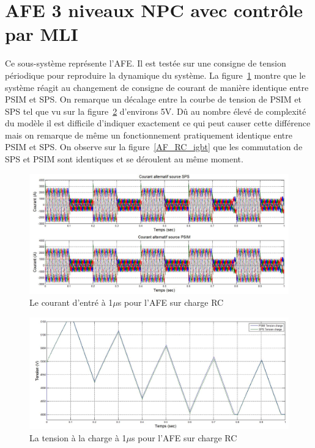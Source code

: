 \clearpage
\section{AFE 3 niveaux NPC avec contrôle par MLI}
Ce sous-système représente l'AFE. Il est testée sur une consigne de tension périodique pour reproduire la dynamique du système. La figure~\ref{AF_RC_cou} montre que le système réagit au changement de consigne de courant de manière identique entre PSIM et SPS. On remarque un décalage entre la courbe de tension de PSIM et SPS tel que vu sur la figure~\ref{AF_RC_ten} d'environs 5V. Dû au nombre élevé de complexité du modèle il est difficile d'indiquer exactement ce qui peut causer cette différence mais on remarque de même un fonctionnement pratiquement identique entre PSIM et SPS. On observe sur la figure~\ref{AF_RC_igbt} que les commutation de SPS et PSIM sont identiques et se déroulent au même moment.


\begin{figure}[htb]
\centering
\includegraphics[scale=0.5]{fig/coual_afe.jpg}
\caption{Le courant d'entré à 1$\mu$s pour l'AFE sur charge RC}
\label{AF_RC_cou}
\end{figure}




\begin{figure}[htb]
\centering
\includegraphics[scale=0.5]{fig/ten_afe.jpg}
\caption{La tension à la charge à 1$\mu$s pour l'AFE sur charge RC}
\label{AF_RC_ten}
\end{figure}



